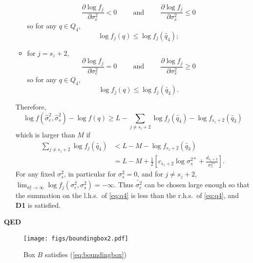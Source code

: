 \documentclass{report}
\newcommand{\RL}{f}
\newcommand{\logRL}{\log\RL}
\newcommand{\sigssq}{\sigma_s^2}
\newcommand{\sigesq}{\sigma_e^2}
\newcommand{\sshat}{\hat\sigma^2_e,\hat\sigma^2_s}
\begin{document}
\begin{itemize}
\begin{itemize}
    \begin{equation*}
      \frac{\partial\logRL_j}{\partial\sigesq} < 0 \hspace{1cm} \text{and} \hspace{1cm}
      \frac{\partial\logRL_j}{\partial\sigssq} \le 0
    \end{equation*}
    so for any $q \in Q_4$,
    \begin{equation*}
      \logRL_j(q) \le \logRL_j(\widetilde{q_4});
    \end{equation*}
  \item  for $j = s_z+2$,
    \begin{equation*}
      \frac{\partial\logRL_j}{\partial\sigesq} = 0 \hspace{1cm} \text{and} \hspace{1cm}
      \frac{\partial\logRL_j}{\partial\sigssq} \ge 0
    \end{equation*}
    so for any $q \in Q_4$,
    \begin{equation*}
      \logRL_j(q) \le \logRL_j(\widetilde{q_3}).
    \end{equation*}
  \end{itemize}
  Therefore,
  \begin{equation*}
	\logRL(\sshat) - \logRL(q) \ge L - \sum_{j \ne s_z+2} \logRL_j(\widetilde{q_4}) - \logRL_{s_z+2}(\widetilde{q_3})
  \end{equation*}
  which is larger than $M$ if
  \begin{equation}
  \label{eq:q4}
    \begin{split}
      \sum_{j \ne s_z+2} \logRL_j(\widetilde{q_4})
        &< L - M - \logRL_{s_z+2}(\widetilde{q_3})\\
        &= L - M + \frac{1}{2} \left[ c_{s_z+2}\log\sigma_s^{2*} + \frac{d_{s_z+2}}{\sigma_s^{2*}}\right].
    \end{split}
  \end{equation}
  For any fixed $\sigssq$, in particular for $\sigssq=0$, and for $j \ne s_z+2$,\\ $\lim_{\sigesq \rightarrow \infty}
  \logRL_j(\sigesq,\sigssq) = -\infty$.  Thus $\widetilde{\sigma_e^2}$ can be chosen large enough so that the
  summation on the l.h.s.~of \eqref{eq:q4} is less than the r.h.s.~of \eqref{eq:q4}, and  \textbf{D1} is satisfied.\end{itemize}  
\textbf{QED}\\

\begin{figure}[h]
	\centering
	\texttt{[image: figs/boundingbox2.pdf]}
	\caption{Box $B$ satisfies (\ref{eq:boundingbox})}
	\label{fig:boundingbox2}
\end{figure}
\end{document}
